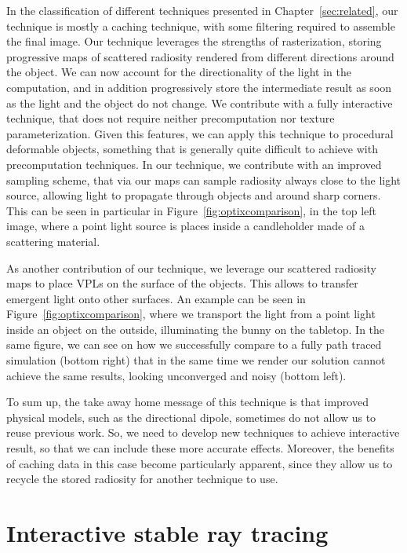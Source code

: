 In the classification of different techniques presented in Chapter~\ref{sec:related}, our technique is mostly a caching technique, with some filtering required to assemble the final image. Our technique leverages the strengths of rasterization, storing progressive maps of scattered radiosity rendered from different directions around the object. We can now account for the directionality of the light in the computation, and in addition progressively store the intermediate result as soon as the light and the object do not change. We contribute with a fully interactive technique, that does not require neither precomputation nor texture parameterization. Given this features, we can apply this technique to procedural deformable objects, something that is generally quite difficult to achieve with precomputation techniques. In our technique, we contribute with an improved sampling scheme, that via our maps can sample radiosity always close to the light source, allowing light to propagate through objects and around sharp corners. This can be seen in particular in Figure~\ref{fig:optixcomparison}, in the top left image, where a point light source is places inside a candleholder made of a scattering material.  

As another contribution of our technique, we leverage our scattered radiosity maps to place VPLs on the surface of the objects. This allows to transfer emergent light onto other surfaces. An example can be seen in Figure~\ref{fig:optixcomparison}, where we transport the light from a point light inside an object on the outside, illuminating the bunny on the tabletop. In the same figure, we can see on how we successfully compare to a fully path traced simulation (bottom right) that in the same time we render our solution cannot achieve the same results, looking unconverged and noisy (bottom left).

To sum up, the take away home message of this technique is that improved physical models, such as the directional dipole, sometimes do not allow us to reuse previous work. So, we need to develop new techniques to achieve interactive result, so that we can include these more accurate effects. Moreover, the benefits of caching data in this case become particularly apparent, since they allow us to recycle the stored radiosity for another technique to use. 

\section{Interactive stable ray tracing}

